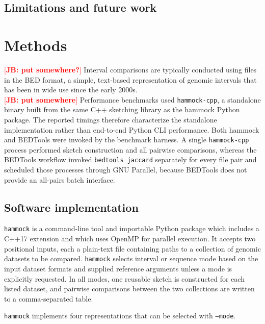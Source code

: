 \documentclass[11pt]{article}
\newcommand{\JB}[1]{\textcolor{red}{[\textbf{JB: #1}]}}
\newcommand{\program}[1]{\texttt{#1}}
\begin{document}
\subsection{Limitations and future work}

\section{Methods}

\JB{put somewhere?} Interval comparisons are typically conducted using files in the BED format, a simple, text-based representation of genomic intervals that has been in wide use since the early 2000s\cite{kent_hgbrowser}. \\
\JB{put somewhere} Performance benchmarks used \program{hammock-cpp}, a standalone binary built from the same C++ sketching library as the hammock Python package. The reported timings therefore characterize the standalone implementation rather than end-to-end Python CLI performance. Both hammock and BEDTools were invoked by the benchmark harness. A single \program{hammock-cpp} process performed sketch construction and all pairwise comparisons, whereas the BEDTools workflow invoked \texttt{bedtools jaccard} separately for every file pair and scheduled those processes through GNU Parallel, because BEDTools does not provide an all-pairs batch interface.

\subsection{Software implementation}

\program{hammock} is a command-line tool and importable Python package which includes a C++17 extension and which uses OpenMP for parallel execution. It accepts two positional inputs, each a plain-text file containing paths to a collection of genomic datasets to be compared. \program{hammock} selects interval or sequence mode based on the input dataset formats and supplied reference arguments unless a mode is explicitly requested. In all modes, one reusable sketch is constructed for each listed dataset, and pairwise comparisons between the two collections are written to a comma-separated table.

\program{hammock} implements four representations that can be selected with \texttt{--mode}.
\end{document}
